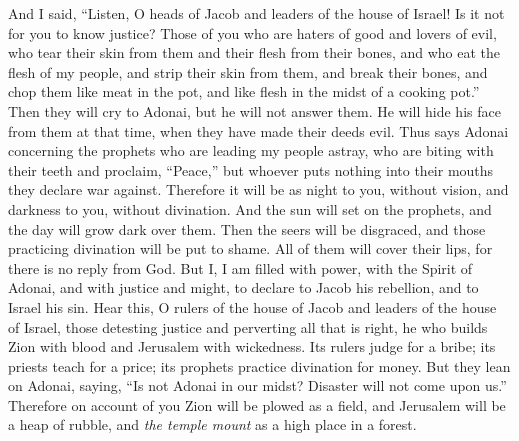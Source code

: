 \begin{biblechapter} %
 And I said, 
“Listen, O heads of Jacob 
and leaders of the house of Israel! 
Is it not for you to know justice?
\verse Those of you who are haters of good 
and lovers of evil, 
who tear their skin from them 
and their flesh from their bones,
\verse and who eat the flesh of my people, 
and strip their skin from them, 
and break their bones, 
and chop them like meat in the pot, 
and like flesh in the midst of a cooking pot.”
\verse Then they will cry to Adonai, 
but he will not answer them. 
He will hide his face from them at that time, 
when they have made their deeds evil.
\verse Thus says Adonai concerning the prophets 
who are leading my people astray, 
who are biting with their teeth 
and proclaim, “Peace,” 
but whoever puts nothing into their mouths 
they declare war against.
\verse Therefore it will be as night to you, without vision, 
and darkness to you, without divination. 
And the sun will set on the prophets, 
and the day will grow dark over them.
\verse Then the seers will be disgraced, 
and those practicing divination will be put to shame. 
All of them will cover their lips, 
for there is no reply from God.
\verse But I, I am filled with power, 
with the Spirit of Adonai, 
and with justice and might, 
to declare to Jacob his rebellion, 
and to Israel his sin.
\verse Hear this, O rulers of the house of Jacob 
and leaders of the house of Israel, 
those detesting justice 
and perverting all that is right,
\verse he who builds Zion with blood 
and Jerusalem with wickedness.
\verse Its rulers judge for a bribe; 
its priests teach for a price; 
its prophets practice divination for money. 
But they lean on Adonai, saying, 
“Is not Adonai in our midst? 
Disaster will not come upon us.”
\verse Therefore on account of you 
Zion will be plowed as a field, 
and Jerusalem will be a heap of rubble, 
and \textit{the temple mount} as a high place in a forest.
\end{biblechapter}

